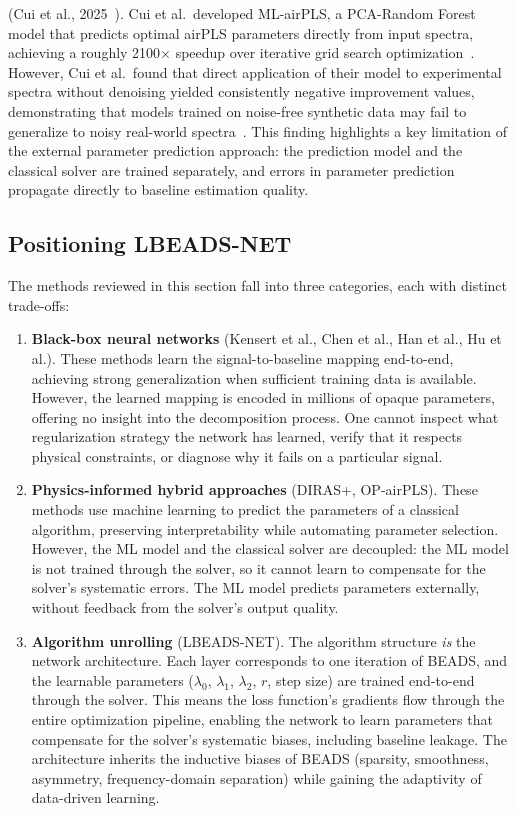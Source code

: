  (Cui et al., 2025~\cite{cui2025opairpls}). Cui et al.\ developed ML-airPLS, a PCA-Random Forest model that predicts optimal airPLS parameters directly from input spectra, achieving a roughly 2100$\times$ speedup over iterative grid search optimization~\cite{cui2025opairpls}. However, Cui et al.\ found that direct application of their model to experimental spectra without denoising yielded consistently negative improvement values, demonstrating that models trained on noise-free synthetic data may fail to generalize to noisy real-world spectra~\cite{cui2025opairpls}. This finding highlights a key limitation of the external parameter prediction approach: the prediction model and the classical solver are trained separately, and errors in parameter prediction propagate directly to baseline estimation quality.

\subsection{Positioning LBEADS-NET}
\label{sec:bg_positioning}

The methods reviewed in this section fall into three categories, each with distinct trade-offs:

\begin{enumerate}
    \item \textbf{Black-box neural networks} (Kensert et al., Chen et al., Han et al., Hu et al.). These methods learn the signal-to-baseline mapping end-to-end, achieving strong generalization when sufficient training data is available. However, the learned mapping is encoded in millions of opaque parameters, offering no insight into the decomposition process. One cannot inspect what regularization strategy the network has learned, verify that it respects physical constraints, or diagnose why it fails on a particular signal.

    \item \textbf{Physics-informed hybrid approaches} (DIRAS+, OP-airPLS). These methods use machine learning to predict the parameters of a classical algorithm, preserving interpretability while automating parameter selection. However, the ML model and the classical solver are decoupled: the ML model is not trained through the solver, so it cannot learn to compensate for the solver's systematic errors. The ML model predicts parameters externally, without feedback from the solver's output quality.

    \item \textbf{Algorithm unrolling} (LBEADS-NET). The algorithm structure \emph{is} the network architecture. Each layer corresponds to one iteration of BEADS, and the learnable parameters ($\lambda_0$, $\lambda_1$, $\lambda_2$, $r$, step size) are trained end-to-end through the solver. This means the loss function's gradients flow through the entire optimization pipeline, enabling the network to learn parameters that compensate for the solver's systematic biases, including baseline leakage. The architecture inherits the inductive biases of BEADS (sparsity, smoothness, asymmetry, frequency-domain separation) while gaining the adaptivity of data-driven learning.
\end{enumerate}

